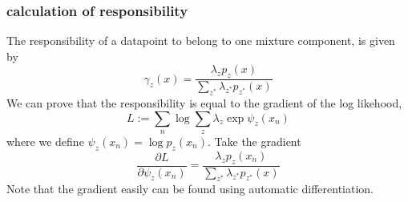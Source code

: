 \subsubsection{calculation of responsibility}
The responsibility of a datapoint to belong to one mixture component, is given by
$$\gamma_z(x) = \frac{\lambda_z p_z(x)}{\sum_{z^*} \lambda_{z^*} p_{z^*}(x)}$$
We can prove that the responsibility is equal to the gradient of the log likehood, 
$$L:= \sum_n \log \sum_z \lambda_z \exp \psi_z(x_n)$$
where we define $\psi_z(x_n) = \log p_z(x_n)$. Take the gradient 
$$\frac{\partial L}{\partial \psi_{z}(x_{n})} = \frac{\lambda_z p_z(x_n)}{\sum_{z^*} \lambda_{z^*} p_{z^*}(x)}$$
Note that the gradient easily can be found using automatic differentiation. 




